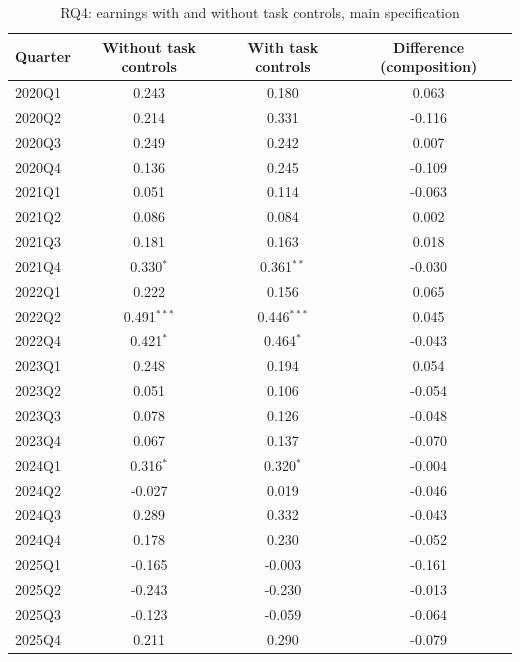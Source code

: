 \begin{table}[htbp]\centering
\caption{RQ4: earnings with and without task controls, main specification}
\begin{tabular}{lccc}
\toprule
Quarter & Without task controls & With task controls & Difference (composition) \\
\midrule
2020Q1 & 0.243 & 0.180 & 0.063 \\
2020Q2 & 0.214 & 0.331 & -0.116 \\
2020Q3 & 0.249 & 0.242 & 0.007 \\
2020Q4 & 0.136 & 0.245 & -0.109 \\
2021Q1 & 0.051 & 0.114 & -0.063 \\
2021Q2 & 0.086 & 0.084 & 0.002 \\
2021Q3 & 0.181 & 0.163 & 0.018 \\
2021Q4 & 0.330$^{*}$ & 0.361$^{**}$ & -0.030 \\
2022Q1 & 0.222 & 0.156 & 0.065 \\
2022Q2 & 0.491$^{***}$ & 0.446$^{***}$ & 0.045 \\
2022Q4 & 0.421$^{*}$ & 0.464$^{*}$ & -0.043 \\
2023Q1 & 0.248 & 0.194 & 0.054 \\
2023Q2 & 0.051 & 0.106 & -0.054 \\
2023Q3 & 0.078 & 0.126 & -0.048 \\
2023Q4 & 0.067 & 0.137 & -0.070 \\
2024Q1 & 0.316$^{*}$ & 0.320$^{*}$ & -0.004 \\
2024Q2 & -0.027 & 0.019 & -0.046 \\
2024Q3 & 0.289 & 0.332 & -0.043 \\
2024Q4 & 0.178 & 0.230 & -0.052 \\
2025Q1 & -0.165 & -0.003 & -0.161 \\
2025Q2 & -0.243 & -0.230 & -0.013 \\
2025Q3 & -0.123 & -0.059 & -0.064 \\
2025Q4 & 0.211 & 0.290 & -0.079 \\
\bottomrule
\end{tabular}
\par\vspace{2pt}{\footnotesize Difference = without minus with task controls; point estimate only. * p<0.10, ** p<0.05, *** p<0.01.}
\end{table}
